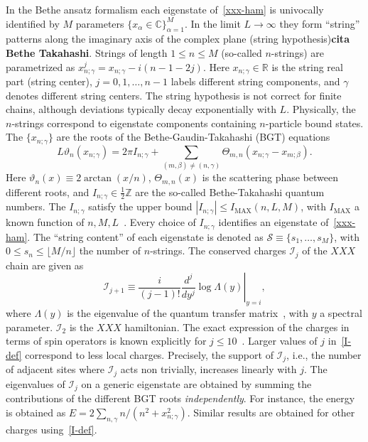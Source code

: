 \documentclass[twocolumn,superscriptaddress,prb,10pt]{revtex4-1}
\begin{document}
In the Bethe ansatz formalism each eigenstate of~\eqref{xxx-ham} is univocally identified 
by $M$ parameters  $\{x_\alpha\in\mathbb{C}\}_{\alpha=1}^M$. In the limit $L\to\infty$ they 
form ``string'' patterns along the imaginary axis of the complex 
plane (string hypothesis){\bf cita Bethe Takahashi}. Strings of length $1\le n\le M$ 
(so-called $n$-strings) are parametrized as $x_{n;\gamma}^{j}=x_{n;\gamma}-i(n-1-2j)$. 
Here $x_{n;\gamma}\in\mathbb{R}$ is the string real part (string center), $j=0,1,\dots,n-1$ 
labels different string components, and $\gamma$ denotes different string centers. The 
string hypothesis is not correct for finite chains, although deviations typically decay 
exponentially with $L$. Physically, the $n$-strings correspond to eigenstate components 
containing $n$-particle bound states. The $\{x_{n;\gamma}\}$ are the roots of the 
Bethe-Gaudin-Takahashi (BGT) equations 
%
\begin{equation}
L\vartheta_n(x_{n;\gamma})=2\pi I_{n;\gamma}+\sum\limits_{(m,\beta)
\ne(n,\gamma)}\Theta_{m,n}(x_{n;\gamma}-x_{m;\beta}).
\label{bt-eq}
\end{equation}
%
Here $\vartheta_n(x)\equiv2\arctan(x/n)$, $\Theta_{m,n}(x)$ is the scattering 
phase between different roots, and $I_{n;\gamma}\in\frac{1}{2}\mathbb{Z}$ are the so-called 
Bethe-Takahashi quantum numbers. The $I_{n;\gamma}$ satisfy the upper bound $|I_{n;\gamma}|
\le I_{\textrm{MAX}}(n,L,M)$, with $I_{\textrm{MAX}}$ a known function of $n,M,L$~\cite{taka-book}. 
Every choice of $I_{n;\gamma}$ identifies an eigenstate of~\eqref{xxx-ham}. 
The ``string content'' of each eigenstate is denoted as ${\mathcal S}\equiv\{s_1,\dots,
s_M\}$, with $0\le s_n\le \lfloor M/n\rfloor$ the number of $n$-strings.  
The conserved charges ${\mathcal I}_j$ of the $XXX$ chain are given as   
%
\begin{equation}
\label{I-def}
\left.{\mathcal I}_{j+1}\equiv\frac{i}{(j-1)!}\frac{d^j}{dy^j}\log\Lambda
(y)\right|_{y=i}, 
\end{equation}
%
where $\Lambda(y)$ is the eigenvalue of the quantum transfer matrix~\cite{kor-book}, 
with $y$ a spectral parameter. ${\mathcal I}_2$ is the $XXX$ hamiltonian. 
The exact expression of the charges in terms of spin operators is known explicitly 
for $j\le 10$~\cite{grabowski-1995}. Larger values of $j$ in~\eqref{I-def} correspond 
to less local charges. Precisely, the support of ${\mathcal I}_j$, i.e., the number of 
adjacent sites where ${\mathcal I}_j$ acts non trivially, increases linearly with $j$.  
The eigenvalues of ${\mathcal I}_j$ on a generic eigenstate are 
obtained by summing the contributions of the different BGT roots {\it independently}. 
For instance, the energy is obtained as $E=2\sum_{n,\gamma} n/(n^2+x^2_{n;\gamma})$. 
Similar results are obtained for other charges using~\eqref{I-def}. 
\end{document}
